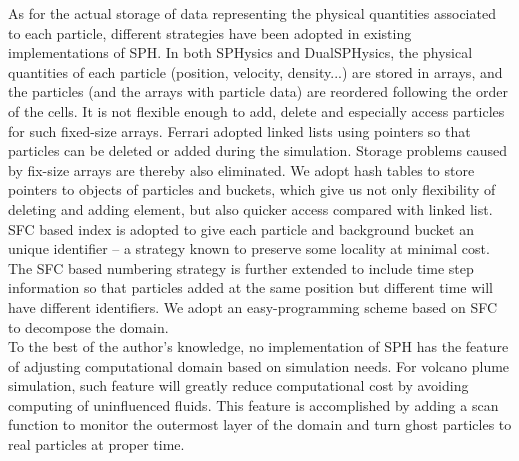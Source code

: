 \documentclass[procedia]{easychair}
\begin{document}
As for the actual storage of data representing the physical quantities associated to each particle, different strategies have been adopted in existing implementations of SPH. 
In both SPHysics and DualSPHysics\cite{crespo2015dualsphysics}, the physical quantities of each particle (position, velocity, density...) are stored in arrays, and the particles (and the arrays with particle data) are reordered following the order of the cells. It is not flexible enough to add, delete and especially access particles for such fixed-size arrays. Ferrari\cite{ferrari2009new} adopted linked lists using pointers so that particles can be deleted or added during the simulation. Storage problems caused by fix-size arrays are thereby also eliminated. We adopt hash tables to store pointers to objects of particles and buckets, which give us not only flexibility of deleting and adding element, but also quicker access compared with linked list. SFC based index is adopted to give each particle and background bucket an unique identifier -- a strategy known to preserve some locality at minimal cost. The SFC based numbering strategy is further extended to include time step information so that particles added at the same position but different time will have different identifiers. 
We adopt an easy-programming scheme based on SFC \cite{patra1999efficient} to decompose the domain.\\
To the best of the author's knowledge, no implementation of SPH has the feature of adjusting computational domain based on simulation needs. For volcano plume simulation, such feature will greatly reduce computational cost by avoiding computing of uninfluenced fluids. This feature is accomplished by adding a scan function to monitor the outermost layer of the domain and turn ghost particles to real particles at proper time.\\
\end{document}
